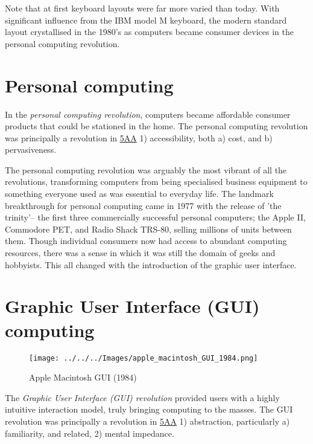 \documentclass[logo,bsc,singlespacing,parskip]{infthesis}
\begin{document}
Note that at first keyboard layouts were far more varied than today.
With significant influence from the IBM model M keyboard, the modern standard layout crystallised in the 1980's as computers became consumer devices in the personal computing revolution.

\section{Personal computing}
\label{sec:orgc4ace2e}
In the \emph{personal computing revolution}, computers became affordable consumer products that could be stationed in the home.
The personal computing revolution was principally a revolution in \hyperref[orgce96c46]{5AA} 1) accessibility, both a) cost, and b) pervasiveness.

The personal computing  revolution was arguably the most vibrant of all the revolutions, transforming computers from being specialised business equipment to something everyone used as was essential to everyday life.
The landmark breakthrough for personal computing came in 1977 with the release of 'the trinity'-- the first three commercially successful personal computers; the Apple II, Commodore PET, and Radio Shack TRS-80, selling millions of units between them.
Though individual consumers now had access to abundant computing resources, there was a sense in which it was still the domain of geeks and hobbyists.
This all changed with the introduction of the graphic user interface.

\section{Graphic User Interface (GUI) computing}
\label{sec:org0a94de4}
\begin{figure}[h]
\centering
\texttt{[image: ../../../Images/apple\_macintosh\_GUI\_1984.png]}
\caption{\label{fig:apple_gui}Apple Macintosh GUI (1984)}
\end{figure}

The \emph{Graphic User Interface (GUI) revolution} provided users with a highly intuitive interaction model, truly bringing computing to the masses.
The GUI revolution was principally a revolution in \hyperref[orgce96c46]{5AA} 1) abstraction, particularly a) familiarity, and related, 2) mental impedance.
\end{document}
